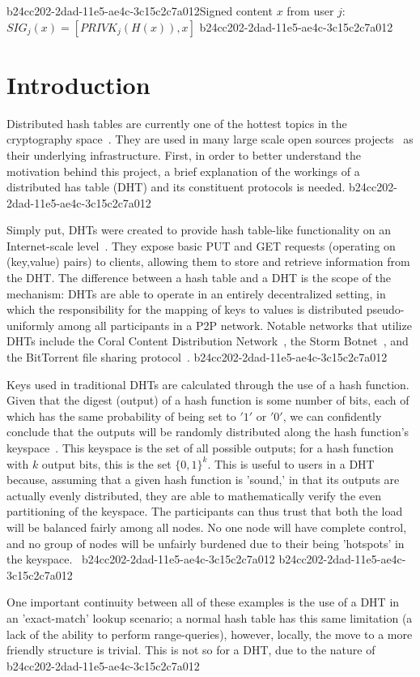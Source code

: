\documentclass[12pt]{article}
\begin{document}
b24cc202-2dad-11e5-ae4c-3c15c2c7a012Signed content $x$ from user $j$: $SIG_j(x) = \left[ PRIVK_j( H(x) ), x \right]$
b24cc202-2dad-11e5-ae4c-3c15c2c7a012
\section{Introduction}
\par Distributed hash tables are currently one of the hottest topics in the cryptography space~\cite{Stoica:2001dj,Rowstron:2001ea,Ratnasamy:2001wn}. They are used in many large scale open sources projects~\cite{Freitas:2013tb,Xu:2010vs,Perfitt:2010fh} as their underlying infrastructure. First, in order to better understand the motivation behind this project, a brief explanation of the workings of a distributed has table (DHT) and its constituent protocols is needed.
b24cc202-2dad-11e5-ae4c-3c15c2c7a012
\par Simply put, DHTs were created to provide hash table-like functionality on an Internet-scale level~\cite{Ratnasamy:2001wn}. They expose basic PUT and GET requests (operating on (key,value) pairs) to clients, allowing them to store and retrieve information from the DHT. The difference between a hash table and a DHT is the scope of the mechanism: DHTs are able to operate in an entirely decentralized setting, in which the responsibility for the mapping of keys to values is distributed pseudo-uniformly among all participants in a P2P network. Notable networks that utilize DHTs include the Coral Content Distribution Network~\cite{Freedman:2004vb}, the Storm Botnet~\cite{Holz:2008uk}, and the BitTorrent file sharing protocol~\cite{Cohen:y1_8mBnw}.
b24cc202-2dad-11e5-ae4c-3c15c2c7a012
\par Keys used in traditional DHTs are calculated through the use of a hash function. Given that the digest (output) of a hash function is some number of bits, each of which has the same probability of being set to $'1'$ or $'0'$, we can confidently conclude that the outputs will be randomly distributed along the hash function's keyspace~. This keyspace is the set of all possible outputs; for a hash function with $k$ output bits, this is the set $\{0,1\}^k$. This is useful to users in a DHT because, assuming that a given hash function is 'sound,' in that its outputs are actually evenly distributed, they are able to mathematically verify the even partitioning of the keyspace. The participants can thus trust that both the load will be balanced fairly among all nodes. No one node will have complete control, and no group of nodes will be unfairly burdened due to their being 'hotspots' in the keyspace.~
b24cc202-2dad-11e5-ae4c-3c15c2c7a012
b24cc202-2dad-11e5-ae4c-3c15c2c7a012\par One important continuity between all of these examples is the use of a DHT in an 'exact-match' lookup scenario; a normal hash table has this same limitation (a lack of the ability to perform range-queries), however, locally, the move to a more friendly structure is trivial. This is not so for a DHT, due to the nature of
\printbibliography
b24cc202-2dad-11e5-ae4c-3c15c2c7a012
\end{document}
